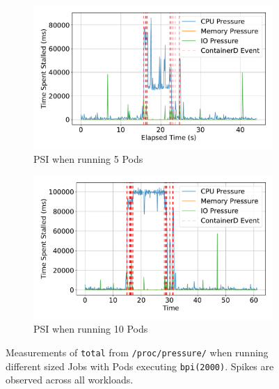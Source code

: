 \begin{figure}[htbp]
    \begin{subfigure}[b]{0.48\textwidth}
        \centering
        \includegraphics[width=\linewidth]{images/pressure-smallbatch.pdf}
        \caption{PSI when running 5 Pods} %
        \label{fig:pressure-smallbatch}
    \end{subfigure}%
    \hfill
    \begin{subfigure}[b]{0.48\textwidth}
        \centering
        \includegraphics[width=\linewidth]{images/pressure-bigbatch.pdf}
        \caption{PSI when running 10 Pods} %
        \label{fig:pressure-bigbatch}
    \end{subfigure}

    \caption{Measurements of \texttt{total} from \texttt{/proc/pressure/} when
    running different sized Jobs with Pods executing \texttt{bpi(2000)}. Spikes
    are observed across all workloads.} %
    \label{fig:pressure-combined} %
\end{figure}

